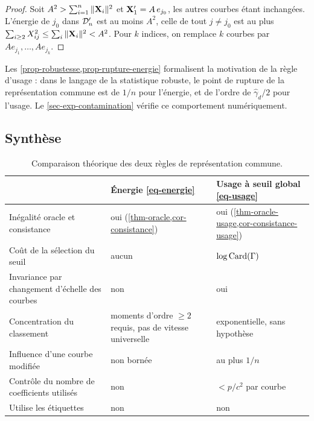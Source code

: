 \begin{proof}
Soit $A^2>\sum_{i=1}^n\|\mathbf{X}_i\|^2$ et $\mathbf{X}'_1=A\,e_{j_0}$, les autres courbes étant inchangées. L'énergie de $j_0$ dans $\mathcal{D}_n'$ est au moins $A^2$, celle de tout $j\neq j_0$ est au plus $\sum_{i\ge2}X_{ij}^2\le\sum_i\|\mathbf{X}_i\|^2<A^2$. Pour $k$ indices, on remplace $k$ courbes par $Ae_{j_1},\dots,Ae_{j_k}$.
\end{proof}

Les \cref{prop-robustesse,prop-rupture-energie} formalisent la motivation de la règle d'usage : dans le langage de la statistique robuste, le point de rupture de la représentation commune est de $1/n$ pour l'énergie, et de l'ordre de $\hat\gamma_d/2$ pour l'usage. Le \cref{sec-exp-contamination} vérifie ce comportement numériquement.

\subsection{Synthèse}

\begin{table}[H]
\centering
\small
\begin{tabular}{@{}>{\raggedright\arraybackslash}p{5.6cm}>{\raggedright\arraybackslash}p{3.9cm}>{\raggedright\arraybackslash}p{4.6cm}@{}}
\toprule
 & Énergie \eqref{eq-energie} & Usage à seuil global \eqref{eq-usage} \\
\midrule
Inégalité oracle et consistance & oui (\cref{thm-oracle,cor-consistance}) & oui (\cref{thm-oracle-usage,cor-consistance-usage}) \\
Coût de la sélection du seuil & aucun & $\log\operatorname{Card}(\Gamma)$ \\
Invariance par changement d'échelle des courbes & non & oui \\
Concentration du classement & moments d'ordre $\ge2$ requis, pas de vitesse universelle & exponentielle, sans hypothèse \\
Influence d'une courbe modifiée & non bornée & au plus $1/n$ \\
Contrôle du nombre de coefficients utilisés & non & $<p/c^2$ par courbe \\
Utilise les étiquettes & non & non \\
\bottomrule
\end{tabular}
\caption{Comparaison théorique des deux règles de représentation commune.}
\label{tab-synthese-theorie}
\end{table}
